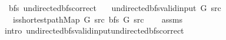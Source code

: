 \begin{isabellebody}
\isamarkupfalse%
%
\endisatagproof
{\isafoldproof}%
%
\isadelimproof
\isanewline
%
\endisadelimproof
%
\isadeliminvisible
\isanewline
%
\endisadeliminvisible
%
\isataginvisible
{}\isamarkupfalse%
\ {\isacharparenleft}{\kern0pt}\ bfs{\isacharparenright}{\kern0pt}\ undirected{\isacharunderscore}{\kern0pt}bfs{\isacharunderscore}{\kern0pt}correct{\isacharcolon}{\kern0pt}\isanewline
\ \ \ {\isachardoublequoteopen}undirected{\isacharunderscore}{\kern0pt}bfs{\isacharunderscore}{\kern0pt}valid{\isacharunderscore}{\kern0pt}input{\isacharprime}{\kern0pt}\ G\ src{\isachardoublequoteclose}\isanewline
\ \ \ {\isachardoublequoteopen}is{\isacharunderscore}{\kern0pt}shortest{\isacharunderscore}{\kern0pt}path{\isacharunderscore}{\kern0pt}Map\ G\ src\ {\isacharparenleft}{\kern0pt}bfs\ G\ src{\isacharparenright}{\kern0pt}{\isachardoublequoteclose}%
\endisataginvisible
{\isafoldinvisible}%
%
\isadeliminvisible
\isanewline
%
\endisadeliminvisible
%
\isadelimproof
\ \ %
\endisadelimproof
%
\isatagproof
{}\isamarkupfalse%
\ assms\isanewline
\ \ \isamarkupfalse%
\ {\isacharparenleft}{\kern0pt}intro\ undirected{\isacharunderscore}{\kern0pt}bfs{\isacharunderscore}{\kern0pt}valid{\isacharunderscore}{\kern0pt}input{\isachardot}{\kern0pt}undirected{\isacharunderscore}{\kern0pt}bfs{\isacharunderscore}{\kern0pt}correct{\isacharparenright}{\kern0pt}%
\endisatagproof
{\isafoldproof}%
%
\isadelimproof
\isanewline
%
\endisadelimproof
%
\isadeliminvisible
\isanewline
%
\endisadeliminvisible
%
\isataginvisible
{}\isamarkupfalse%
%
\endisataginvisible
{\isafoldinvisible}%
%
\isadeliminvisible
%
\endisadeliminvisible
%
\end{isabellebody}%
\endinput

